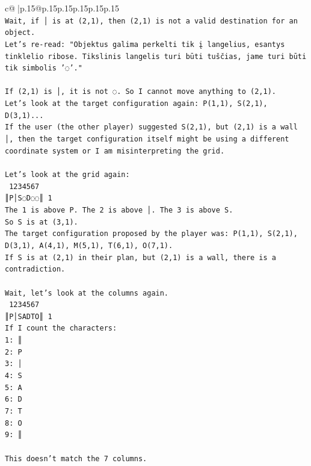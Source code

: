 \documentclass{article}
\begin{document}
{\begin{supertabular}{c@{$\;$}|p{.15\linewidth}@{}p{.15\linewidth}p{.15\linewidth}p{.15\linewidth}p{.15\linewidth}p{.15\linewidth}}
{{{\\ 
\texttt{Wait, if │ is at (2,1), then (2,1) is not a valid destination for an object.} \\
\texttt{Let's re{-}read: "Objektus galima perkelti tik į langelius, esantys tinklelio ribose. Tikslinis langelis turi būti tuščias, jame turi būti tik simbolis '◌'."} \\
\\ 
\texttt{If (2,1) is │, it is not ◌. So I cannot move anything to (2,1).} \\
\texttt{Let's look at the target configuration again: P(1,1), S(2,1), D(3,1)...} \\
\texttt{If the user (the other player) suggested S(2,1), but (2,1) is a wall │, then the target configuration itself might be using a different coordinate system or I am misinterpreting the grid.} \\
\\ 
\texttt{Let's look at the grid again:} \\
\texttt{ 1234567} \\
\texttt{║P│S◌D◌◌║ 1} \\
\texttt{The 1 is above P. The 2 is above │. The 3 is above S.} \\
\texttt{So S is at (3,1).} \\
\texttt{The target configuration proposed by the player was: P(1,1), S(2,1), D(3,1), A(4,1), M(5,1), T(6,1), O(7,1).} \\
\texttt{If S is at (2,1) in their plan, but (2,1) is a wall, there is a contradiction.} \\
\\ 
\texttt{Wait, let's look at the columns again.} \\
\texttt{ 1234567} \\
\texttt{║P│SADTO║ 1} \\
\texttt{If I count the characters:} \\
\texttt{1: ║} \\
\texttt{2: P} \\
\texttt{3: │} \\
\texttt{4: S} \\
\texttt{5: A} \\
\texttt{6: D} \\
\texttt{7: T} \\
\texttt{8: O} \\
\texttt{9: ║} \\
\\ 
\texttt{This doesn't match the 7 columns.} \\
}}}
\end{supertabular}}
\end{document}
